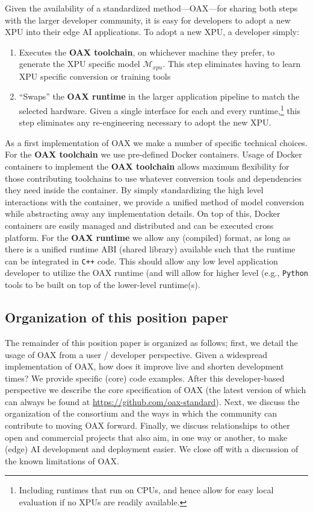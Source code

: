 \documentclass{article}
\newcommand{\oaxgit}{\href{https://github.com/oax-standard}{https://github.com/oax-standard}}
\begin{document}
Given the availability of a standardized method---OAX---for sharing both steps with the larger developer community, it is easy for developers to adopt a new XPU into their edge AI applications. To adopt a new XPU, a developer simply:
\begin{enumerate}
\item Executes the \textbf{OAX toolchain}, on whichever machine they prefer, to generate the XPU specific model $\mathcal{M}_{xpu}$. This step eliminates having to learn XPU specific conversion or training tools
\item ``Swaps'' the \textbf{OAX runtime} in the larger application pipeline to match the selected hardware. Given a single interface for each and every runtime,\footnote{Including runtimes that run on CPUs, and hence allow for easy local evaluation if no XPUs are readily available.} this step eliminates any re-engineering necessary to adopt the new XPU.
\end{enumerate}

As a first implementation of OAX we make a number of specific technical choices. For the \textbf{OAX toolchain} we use pre-defined Docker containers. Usage of Docker containers to implement the  \textbf{OAX toolchain} allows maximum flexibility for those contributing toolchains to use whatever conversion tools and dependencies they need inside the container. By simply standardizing the high level interactions with the container, we provide a unified method of model conversion while abstracting away any implementation details. On top of this, Docker containers are easily managed and distributed and can be executed cross platform. For the  \textbf{OAX runtime} we allow any (compiled) format, as long as there is a unified runtime ABI (shared library) available such that the runtime can be integrated in \texttt{C++} code. This should allow any low level application developer to utilize the OAX runtime (and will allow for higher level (e.g., \texttt{Python} tools to be built on top of the lower-level runtime(s).

\subsection{Organization of this position paper}

The remainder of this position paper is organized as follows; first, we detail the usage of OAX from a user / developer perspective. Given a widespread implementation of OAX, how does it improve live and shorten development times? We provide specific (core) code examples. After this developer-based perspective we describe the core specification of OAX (the latest version of which can always be found at \oaxgit). Next, we discuss the organization of the consortium and the ways in which the community can contribute to moving OAX forward. Finally, we discuss relationships to other open and commercial projects that also aim, in one way or another, to make (edge) AI development and deployment easier. We close off with a discussion of the known limitations of OAX.
\end{document}
